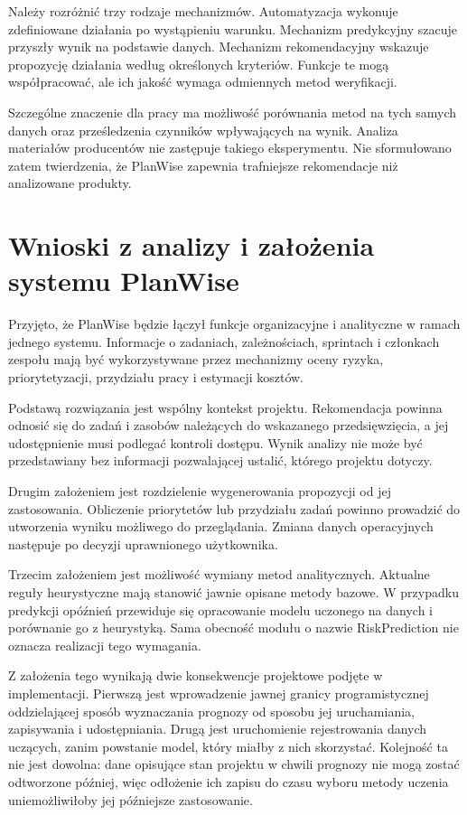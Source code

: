 Należy rozróżnić trzy rodzaje mechanizmów. Automatyzacja wykonuje zdefiniowane działania po wystąpieniu warunku. Mechanizm predykcyjny szacuje przyszły wynik na podstawie danych. Mechanizm rekomendacyjny wskazuje propozycję działania według określonych kryteriów. Funkcje te mogą współpracować, ale ich jakość wymaga odmiennych metod weryfikacji.

Szczególne znaczenie dla pracy ma możliwość porównania metod na tych samych danych oraz prześledzenia czynników wpływających na wynik. Analiza materiałów producentów nie zastępuje takiego eksperymentu. Nie sformułowano zatem twierdzenia, że PlanWise zapewnia trafniejsze rekomendacje niż analizowane produkty.


\section{Wnioski z analizy i założenia systemu PlanWise}
\label{sec:wnioski-i-zalozenia}

Przyjęto, że PlanWise będzie łączył funkcje organizacyjne i analityczne w ramach jednego systemu. Informacje o zadaniach, zależnościach, sprintach i członkach zespołu mają być wykorzystywane przez mechanizmy oceny ryzyka, priorytetyzacji, przydziału pracy i estymacji kosztów.

Podstawą rozwiązania jest wspólny kontekst projektu. Rekomendacja powinna odnosić się do zadań i zasobów należących do wskazanego przedsięwzięcia, a jej udostępnienie musi podlegać kontroli dostępu. Wynik analizy nie może być przedstawiany bez informacji pozwalającej ustalić, którego projektu dotyczy.

Drugim założeniem jest rozdzielenie wygenerowania propozycji od jej zastosowania. Obliczenie priorytetów lub przydziału zadań powinno prowadzić do utworzenia wyniku możliwego do przeglądania. Zmiana danych operacyjnych następuje po decyzji uprawnionego użytkownika.

Trzecim założeniem jest możliwość wymiany metod analitycznych. Aktualne reguły heurystyczne mają stanowić jawnie opisane metody bazowe. W przypadku predykcji opóźnień przewiduje się opracowanie modelu uczonego na danych i porównanie go z heurystyką. Sama obecność modułu o nazwie RiskPrediction nie oznacza realizacji tego wymagania.

Z założenia tego wynikają dwie konsekwencje projektowe podjęte w implementacji. Pierwszą jest wprowadzenie jawnej granicy programistycznej oddzielającej sposób wyznaczania prognozy od sposobu jej uruchamiania, zapisywania i udostępniania. Drugą jest uruchomienie rejestrowania danych uczących, zanim powstanie model, który miałby z nich skorzystać. Kolejność ta nie jest dowolna: dane opisujące stan projektu w chwili prognozy nie mogą zostać odtworzone później, więc odłożenie ich zapisu do czasu wyboru metody uczenia uniemożliwiłoby jej późniejsze zastosowanie.

